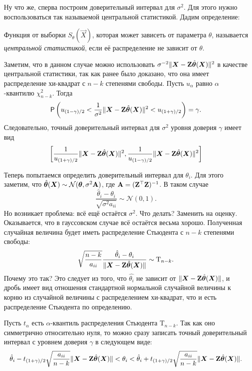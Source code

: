 Ну что же, сперва построим доверительный интервал для $\sigma^{2}$. Для этого нужно воспользоваться так называемой центральной статистикой. Дадим определение:
\begin{definition}
	Функция от выборки $S_{\theta}(\vec{X})$, которая может зависеть от параметра $\theta$, называется \emph{центральной статистикой}, если её распределение не зависит от $\theta$.
\end{definition}
Заметим, что в данном случае можно использовать $\sigma^{-2}\|\bm{X} - \mathbf{Z}\hat{\bm{\theta}}(\bm{X})\|^{2}$ в качестве центральной статистики, так как ранее было доказано, что она имеет распределение хи-квадрат с $n - k$ степенями свободы. Пусть $u_{\alpha}$ равно $\alpha$-квантилю $\chi^{2}_{n - k}$. Тогда
\[
	\mathsf{P}\left(u_{(1 - \gamma)/2} < \frac{1}{\sigma^{2}}\|\bm{X} - \mathbf{Z}\hat{\bm{\theta}}(\bm{X})\|^{2} < u_{(1 + \gamma)/2}\right) = \gamma.
\]
Следовательно, точный доверительный интервал для $\sigma^{2}$ уровня доверия $\gamma$ имеет вид
\[
	\left[\frac{1}{u_{(1 + \gamma)/2}}\|\bm{X} - \mathbf{Z}\hat{\bm{\theta}}(\bm{X})\|^{2}, \frac{1}{u_{(1 - \gamma)/2}}\|\bm{X} - \mathbf{Z}\hat{\bm{\theta}}(\bm{X})\|^{2}\right]
\]

Теперь попытаемся определить доверительный интервал для $\theta_{i}$. Для этого заметим, что $\hat{\bm{\theta}}(\bm{X}) \sim \mathcal{N}(\bm{\theta}, \sigma^{2}\mathbf{A})$, где $\mathbf{A} = (\mathbf{Z}^{\top}\mathbf{Z})^{-1}$. В таком случае 
\[
	\frac{\hat{\theta}_{i} - \theta_{i}}{\sqrt{\sigma^{2}a_{ii}}} \sim \mathcal{N}(0, 1).
\]
Но возникает проблема: всё ещё остаётся $\sigma^{2}$. Что делать? Заменить на оценку. Оказывается, что в гауссовском случае всё остаётся весьма хорошо. Полученная случайная величина будет иметь распределение Стьюдента с $n - k$ степенями свободы:
\[
	\sqrt{\frac{n - k}{a_{ii}}}\frac{\hat{\theta}_{i} - \theta_{i}}{\|\bm{X} - \mathbf{Z}\hat{\bm{\theta}}(\bm{X})\|} \sim \mathrm{T}_{n - k}.
\]
Почему это так? Это следует из того, что $\hat{\theta_{i}}$ не зависит от $\|\bm{X} - \mathbf{Z}\hat{\bm{\theta}}(\bm{X})\|$, и дробь имеет вид отношения стандартной нормальной случайной величины к корню из случайной величины с распределением хи-квадрат, что и есть распределение Стьюдента по определению.

Пусть $t_{\alpha}$ есть $\alpha$-квантиль распределения Стьюдента $\mathrm{T}_{n - k}$. Так как оно симметрично относительно нуля, то можно сразу записать точный доверительный интервал с уровнем доверия $\gamma$ в следующем виде:
\[
	\hat{\theta}_{i} - t_{(1 + \gamma)/2}\sqrt{\frac{a_{ii}}{n - k}}\|\bm{X} - \mathbf{Z}\hat{\bm{\theta}}(\bm{X})\| < \theta_{i} < \hat{\theta}_{i} + t_{(1 + \gamma)/2}\sqrt{\frac{a_{ii}}{n - k}}\|\bm{X} - \mathbf{Z}\hat{\bm{\theta}}(\bm{X})\|.
\]

